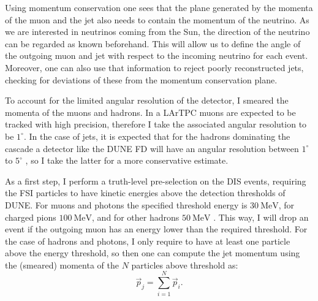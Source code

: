 Using momentum conservation one sees that the plane generated by the momenta of the muon and the jet also needs to contain the momentum of the neutrino. As we are interested in neutrinos coming from the Sun, the direction of the neutrino can be regarded as known beforehand. This will allow us to define the angle of the outgoing muon and jet with respect to the incoming neutrino for each event. Moreover, one can also use that information to reject poorly reconstructed jets, checking for deviations of these from the momentum conservation plane.

To account for the limited angular resolution of the detector, I smeared the momenta of the muons and hadrons. In a LArTPC muons are expected to be tracked with high precision, therefore I take the associated angular resolution to be $1^{\circ}$. In the case of jets, it is expected that for the hadrons dominating the cascade a detector like the DUNE FD will have an angular resolution between $1^{\circ}$ to $5^{\circ}$ \cite{DUNE2020TDR2}, so I take the latter for a more conservative estimate.

As a first step, I perform a truth-level pre-selection on the DIS events, requiring the FSI particles to have kinetic energies above the detection thresholds of DUNE. For muons and photons the specified threshold energy is $30 ~ \mathrm{MeV}$, for charged pions $100 ~ \mathrm{MeV}$, and for other hadrons $50 ~ \mathrm{MeV}$ \cite{DUNE2020TDR2}. This way, I will drop an event if the outgoing muon has an energy lower than the required threshold. For the case of hadrons and photons, I only require to have at least one particle above the energy threshold, so then one can compute the jet momentum using the (smeared) momenta of the $N$ particles above threshold as:
\begin{equation}
	\vec{p}_{j} = \sum_{i=1}^{N} \vec{p}_{i}.
\end{equation}

